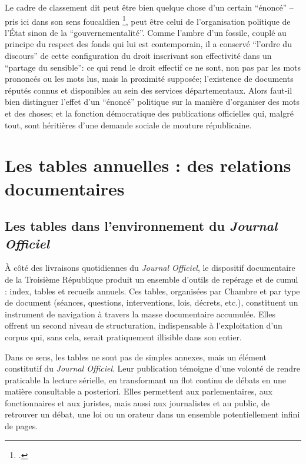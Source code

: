 Le cadre de classement dit peut être bien quelque chose d’un certain \enquote{énoncé} -- pris ici dans son sens foucaldien \footcite[][]{foucault}, peut être celui de l’organisation politique de l’État sinon de la \enquote{gouvernementalité}. Comme l’ambre d’un fossile, couplé au principe du respect des fonds qui lui est contemporain, il a conservé \enquote{l’ordre du discours} de cette configuration du droit inscrivant son effectivité dans un \enquote{partage du sensible}: ce qui rend le droit effectif ce ne sont, non pas par les mots prononcés ou les mots lus, mais la proximité supposée; l’existence de documents réputés connus et disponibles au sein des services départementaux. Alors faut-il bien distinguer l’effet d’un \enquote{énoncé} politique sur la manière d’organiser des mots et des choses; et la fonction démocratique des publications officielles qui, malgré tout, sont héritières d’une demande sociale de mouture républicaine.

\chapter{Les tables annuelles : des relations documentaires}

\section{Les tables dans l’environnement du \emph{Journal Officiel}}

À côté des livraisons quotidiennes du \emph{Journal Officiel}, le dispositif documentaire de la Troisième République produit un ensemble d’outils de repérage et de cumul : index, tables et recueils annuels. Ces tables, organisées par Chambre et par type de document (séances, questions, interventions, lois, décrets, etc.), constituent un instrument de navigation à travers la masse documentaire accumulée. Elles offrent un second niveau de structuration, indispensable à l’exploitation d’un corpus qui, sans cela, serait pratiquement illisible dans son entier.

Dans ce sens, les tables ne sont pas de simples annexes, mais un élément constitutif du \emph{Journal Officiel}. Leur publication témoigne d’une volonté de rendre praticable la lecture sérielle, en transformant un flot continu de débats en une matière consultable a posteriori. Elles permettent aux parlementaires, aux fonctionnaires et aux juristes, mais aussi aux journalistes et au public, de retrouver un débat, une loi ou un orateur dans un ensemble potentiellement infini de pages.


